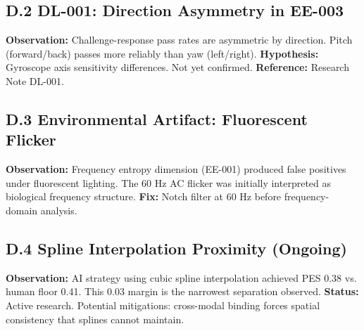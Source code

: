 \subsection*{D.2 DL-001: Direction Asymmetry in EE-003}

\textbf{Observation:} Challenge-response pass rates are asymmetric by direction. Pitch (forward/back) passes more reliably than yaw (left/right).
\textbf{Hypothesis:} Gyroscope axis sensitivity differences. Not yet confirmed.
\textbf{Reference:} Research Note DL-001.

\subsection*{D.3 Environmental Artifact: Fluorescent Flicker}

\textbf{Observation:} Frequency entropy dimension (EE-001) produced false positives under fluorescent lighting. The 60 Hz AC flicker was initially interpreted as biological frequency structure.
\textbf{Fix:} Notch filter at 60 Hz before frequency-domain analysis.

\subsection*{D.4 Spline Interpolation Proximity (Ongoing)}

\textbf{Observation:} AI strategy using cubic spline interpolation achieved PES 0.38 vs. human floor 0.41. This 0.03 margin is the narrowest separation observed.
\textbf{Status:} Active research. Potential mitigations: cross-modal binding forces spatial consistency that splines cannot maintain.
